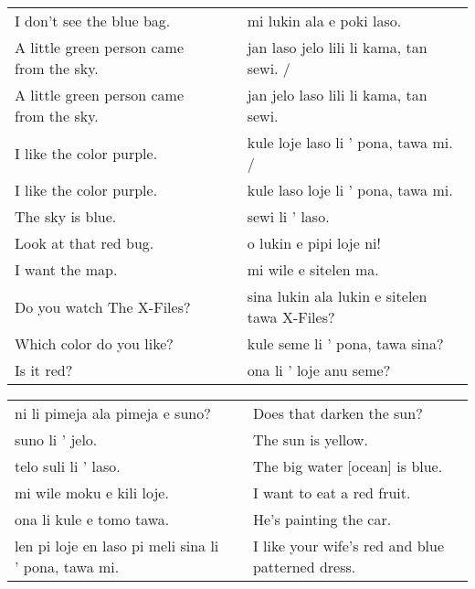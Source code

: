 \begin{supertabular}{p{5,5cm}|ll}
    I don't see the blue bag.                &  & mi lukin ala e poki laso.                    \\ %
    A little green person came from the sky. &  & jan laso jelo lili li kama, tan sewi. /      \\ %
    A little green person came from the sky. &  & jan jelo laso lili li kama, tan sewi.        \\  %
    I like the color purple.                 &  & kule loje laso li ' pona, tawa mi. /         \\ %
    I like the color purple.                 &  & kule laso loje li ' pona, tawa mi.           \\ %
    The sky is blue.                         &  & sewi li ' laso.                              \\ %
    Look at that red bug.                    &  & o lukin e pipi loje ni!                      \\ %
    I want the map.                          &  & mi wile e sitelen ma.                        \\ %
    Do you watch The X-Files?                &  & sina lukin ala lukin e sitelen tawa X-Files? \\ %
    Which color do you like?                 &  & kule seme li ' pona, tawa sina?              \\ %
    Is it red?                               &  & ona li ' loje anu seme?                      \\ %
\end{supertabular}

\begin{supertabular}{p{5,5cm}|ll}
    ni li pimeja ala pimeja e suno?                      &  & Does that darken the sun?                        \\
    suno li ' jelo.                                      &  & The sun is yellow.                               \\
    telo suli li ' laso.                                 &  & The big water [ocean] is blue.                   \\
    mi wile moku e kili loje.                            &  & I want to eat a red fruit.                       \\
    ona li kule e tomo tawa.                             &  & He's painting the car.                           \\
    len pi loje en laso pi meli sina li ' pona, tawa mi. &  & I like your wife's red and blue patterned dress. \\
\end{supertabular}

